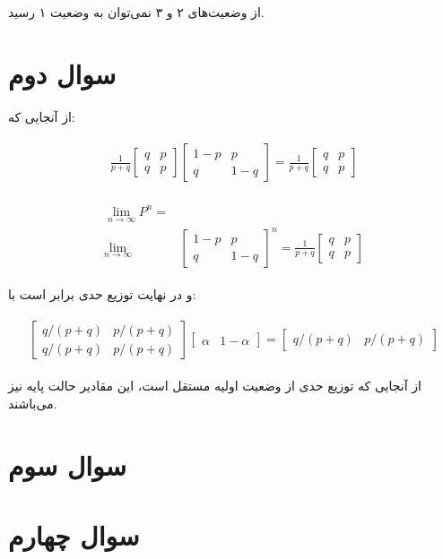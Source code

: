 \documentclass[paper=a4, fontsize=11pt]{article}
\numberwithin{equation}{section} %
\numberwithin{figure}{section} %
\numberwithin{table}{section} %
\begin{document}
از وضعیت‌های ۲ و ۳ نمی‌توان به وضعیت ۱ رسید.

\section{سوال دوم}

از آنجایی که:

\begin{align}
\begin{split}
    \frac{1}{p + q}
    \begin{bmatrix}
        q & p \\
        q & p
    \end{bmatrix}
    \begin{bmatrix}
        1 - p & p \\
        q & 1 - q
    \end{bmatrix}
    =
    \frac{1}{p + q}
    \begin{bmatrix}
        q & p \\
        q & p
    \end{bmatrix}
\end{split}
\end{align}

\begin{align}
\begin{split}
    \lim_{n\to\infty} P^n = &\\
    \lim_{n\to\infty}
    & \begin{bmatrix}
        1 - p & p \\
        q & 1 - q
    \end{bmatrix}^n
    = \frac{1}{p + q}
    \begin{bmatrix}
        q & p \\
        q & p
    \end{bmatrix}
\end{split}
\end{align}

و در نهایت توزیع حدی برابر است با:

\begin{align}
\begin{split}
    \begin{bmatrix}
        q/(p + q) & p/(p + q) \\
        q/(p + q) & p/(p + q)
    \end{bmatrix}
    \begin{bmatrix}
        \alpha & 1 - \alpha
    \end{bmatrix}
    =
    \begin{bmatrix}
        q/(p + q) & p/(p + q)
    \end{bmatrix}
\end{split}
\end{align}

از آنجایی که توزیع حدی از وضعیت اولیه مستقل است، این مقادیر حالت پایه نیز می‌باشند.

\section{سوال سوم}
\section{سوال چهارم}
\end{document}
